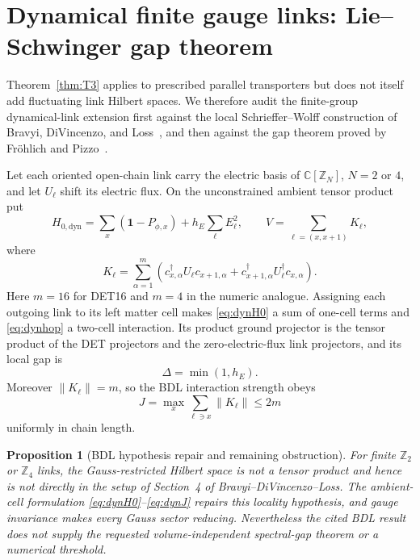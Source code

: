 \documentclass[11pt]{article}
\newtheorem{proposition}[theorem]{Proposition}
\theoremstyle{remark}
\newcommand{\C}{\mathbb C}
\newcommand{\id}{\mathbf 1}
\newcommand{\norm}[1]{\left\lVert #1\right\rVert}
\begin{document}
\section{Dynamical finite gauge links: Lie--Schwinger gap theorem}
\label{sec:dynlinks}

Theorem~\ref{thm:T3} applies to prescribed parallel transporters but does
not itself add fluctuating link Hilbert spaces.  We therefore audit the
finite-group dynamical-link extension first against the local
Schrieffer--Wolff construction of Bravyi, DiVincenzo, and
Loss~\cite{BDL2011}, and then against the gap theorem proved by
Fröhlich and Pizzo~\cite{FP2020}.

Let each oriented open-chain link carry the electric basis of
$\C[\mathbb Z_N]$, $N=2$ or $4$, and let $U_\ell$ shift its electric
flux.  On the unconstrained ambient tensor product put
\[
 H_{0,\mathrm{dyn}}
 =\sum_x(\id-P_{\phi,x})+h_E\sum_\ell E_\ell^2,\qquad
 V=\sum_{\ell=(x,x+1)}K_\ell ,
\tag{5.2}\label{eq:dynH0}
\]
where
\[
 K_\ell=\sum_{\alpha=1}^{m}
 \left(c^\dagger_{x,\alpha}U_\ell c_{x+1,\alpha}
 +c^\dagger_{x+1,\alpha}U_\ell^\dagger c_{x,\alpha}\right).
\tag{5.3}\label{eq:dynhop}
\]
Here $m=16$ for DET16 and $m=4$ in the numeric analogue.  Assigning each
outgoing link to its left matter cell makes \eqref{eq:dynH0} a sum of
one-cell terms and \eqref{eq:dynhop} a two-cell interaction.  Its product
ground projector is the tensor product of the DET projectors and the
zero-electric-flux link projectors, and its local gap is
\[
 \Delta=\min(1,h_E).
\tag{5.4}\label{eq:dyndelta}
\]
Moreover $\norm{K_\ell}=m$, so the BDL interaction strength obeys
\[
 J=\max_x\sum_{\ell\ni x}\norm{K_\ell}\leq2m
\tag{5.5}\label{eq:dynJ}
\]
uniformly in chain length.

\begin{proposition}[BDL hypothesis repair and remaining obstruction]
\label{prop:BDLaudit}
For finite $\mathbb Z_2$ or $\mathbb Z_4$ links, the Gauss-restricted
Hilbert space is not a tensor product and hence is not directly in the
setup of Section~4 of Bravyi--DiVincenzo--Loss.  The ambient-cell
formulation \eqref{eq:dynH0}--\eqref{eq:dynJ} repairs this locality
hypothesis, and gauge invariance makes every Gauss sector reducing.
Nevertheless the cited BDL result does not supply the requested
volume-independent spectral-gap theorem or a numerical threshold.
\end{proposition}
\end{document}
